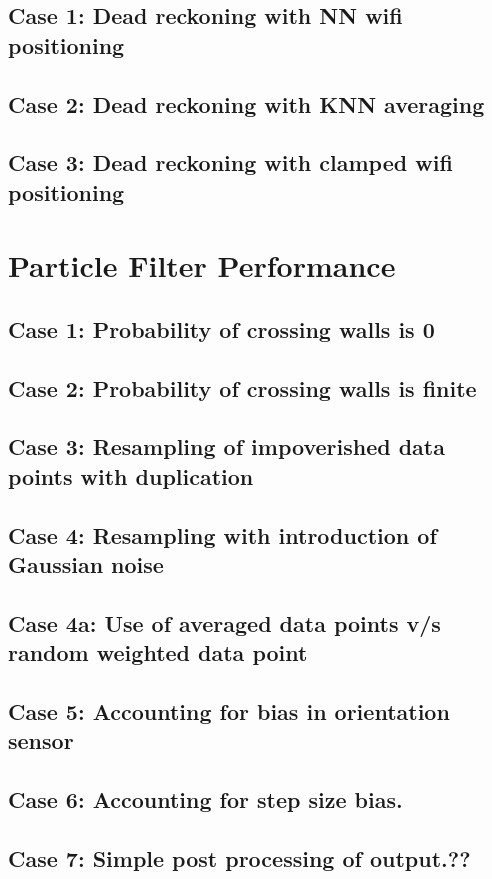 \subsection{Case 1: Dead reckoning with NN wifi positioning}
\subsection{Case 2: Dead reckoning with KNN averaging}
\subsection{Case 3: Dead reckoning with clamped wifi positioning}

\section{Particle Filter Performance}
\subsection{Case 1: Probability of crossing walls is 0}
\subsection{Case 2: Probability of crossing walls is finite}
\subsection{Case 3: Resampling of impoverished data points with duplication}
\subsection{Case 4: Resampling with introduction of Gaussian noise}
\subsection{Case 4a: Use of averaged data points v/s random weighted data point}
\subsection{Case 5: Accounting for bias in orientation sensor}
\subsection{Case 6: Accounting for step size bias.}
\subsection{Case 7: Simple post processing of output.??}
